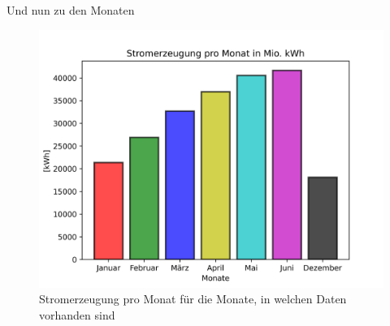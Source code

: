 \documentclass[12pt,a4paper,notitlepage]{scrreprt}
\begin{document}
Und nun zu den Monaten

\begin{figure}
    \centering
    \includegraphics[scale=0.7]{images/Stromerzeugung_pro_Monat.png}
    \caption{Stromerzeugung pro Monat für die Monate, in welchen Daten vorhanden sind}
    \label{Stromerzeugung}
\end{figure}
\end{document}
